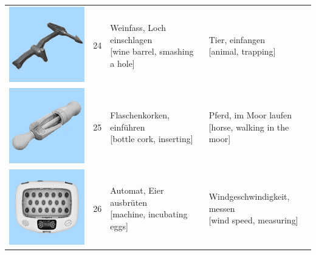 \documentclass[
  english,
  doc,12pt,twoside,floatsintext]{apa7}
\begin{document}
\begin{center}
\begin{ThreePartTable}
{\begin{longtable}{llll}
\includegraphics[valign=c, scale=0.23]{../materials/unfamiliar/24.png} & 24 & \makecell[l]{Weinfass, Loch einschlagen\\{[wine barrel, smashing a hole]}} & \makecell[l]{Tier, einfangen\\{[animal, trapping]}}\\
\includegraphics[valign=c, scale=0.23]{../materials/unfamiliar/25.png} & 25 & \makecell[l]{Flaschenkorken, einführen\\{[bottle cork, inserting]}} & \makecell[l]{Pferd, im Moor laufen\\{[horse, walking in the moor]}}\\
\includegraphics[valign=c, scale=0.23]{../materials/unfamiliar/26.png} & 26 & \makecell[l]{Automat, Eier ausbrüten\\{[machine, incubating eggs]}} & \makecell[l]{Windgeschwindigkeit, messen\\{[wind speed, measuring]}}\\

\end{longtable}}
\end{ThreePartTable}
\end{center}
\end{document}
